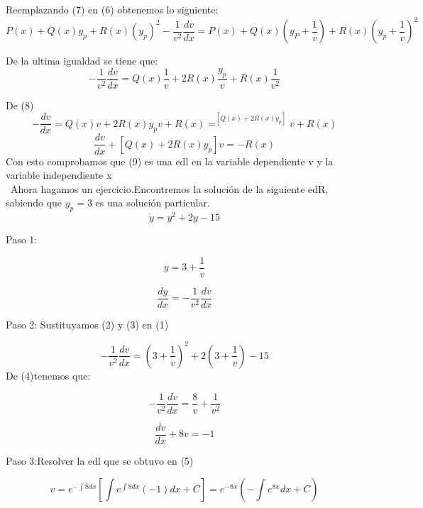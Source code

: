 \documentclass[10pt,a4paper]{article}
\begin{document}
{{{Reemplazando  (7) en (6) obtenemos lo siguiente:
 \begin{equation*}
P(x)+Q(x)y_p+R(x)(y_p)^{2}-\dfrac{1}{v^2}\dfrac{dv}{dx}=P(x)+Q(x)(y_P+\dfrac{1}{v})+R(x)(y_p+\dfrac{1}{v})^2
\end{equation*}

De la ultima igualdad se tiene que:
\begin{equation}\tag{8}
-\dfrac{1}{v^2}\dfrac{dv}{dx}=Q(x)\dfrac{1}{v}+2R(x)\dfrac{y_p}{v}+R(x)\dfrac{1}{v^2}
\end{equation}

De (8)
\begin{equation}\tag{9}
-\dfrac{dv}{dx}=Q(x)v+2R(x)y_pv+R(x)=^[Q(x)+2R(x)y_p]v+R(x)
\end{equation}
\begin{equation*}
\dfrac{dv}{dx}+[Q(x)+2R(x)y_p]v=-R(x)
\end{equation*}
Con esto comprobamos que (9) es una edl en la variable dependiente v y la variable independiente x\\
\,
Ahora hagamos un ejercicio.Encontremos la solución de la siguiente edR, sabiendo que $y_p=3$ es una solución particular.
\begin{equation}\tag{1}
\dot{y}= y^2+2y-15
\end{equation}

Paso 1:
{\begin{equation}\tag{2}
 y=3+\dfrac{1}{v}
\end{equation}
  {\begin{equation} \tag{3} 
    \dfrac{dy}{dx}=-\dfrac{1}{v^2}\dfrac{dv}{dx} 
\end{equation}

Paso 2: Sustituyamos (2) y (3) en (1)

 {\begin{equation} \tag{4} 
    -\dfrac{1}{v^2}\dfrac{dv}{dx}=(3+\dfrac{1}{v})^2+2(3+\dfrac{1}{v})-15
\end{equation}
De (4)tenemos que:

 {\begin{equation} \tag{5} 
    -\dfrac{1}{v^2}\dfrac{dv}{dx}=\dfrac{8}{v}+\dfrac{1}{v^2}
 \end{equation}
  {\begin{equation*}
    \dfrac{dv}{dx}+8v=-1
\end{equation*}

Paso 3:Resolver la edl que se obtuvo en (5)

  {\begin{equation*}
    v=e^{-\int8dx}[\int e^{\int 8dx}(-1)dx+C]=e^{-8x}(-\int e^{8x}dx+C)
\end{equation*}

}}}}}}}}}
\end{document}

